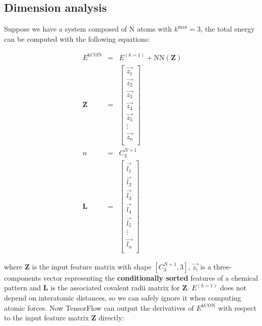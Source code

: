 \documentclass{article}
\begin{document}
\subsection{Dimension analysis}

Suppose we have a system composed of N atoms with $k^\mathrm{max}=3$, the total energy can be 
computed with the following equations:

\begin{eqnarray}
	E^{\mathrm{kCON}} & = & E^{(k=1)} + \mathrm{NN}(\boldsymbol{Z}) \\
	\boldsymbol{Z} & = & \left[
		\begin{array}{c}
			\vec{z_{1}}  \\
			\vec{z_{2}}  \\
			\vec{z_{3}}  \\
			\vec{z_{4}}  \\
			\vec{z_{5}}  \\
			\vdots \\
			\vec{z_{n}}  \\
		\end{array}
	\right]                                                         \\
	n & = & C^{N + 1}_3                                             \\
	\boldsymbol{L} & = & \left[
		\begin{array}{c}
			\vec{l_{1}}  \\
			\vec{l_{2}}  \\
			\vec{l_{3}}  \\
			\vec{l_{4}}  \\
			\vec{l_{5}}  \\
			\vdots \\
			\vec{l_{n}}  \\			
		\end{array}
	\right]
\end{eqnarray}

\noindent where \textbf{Z} is the input feature matrix with shape $[C^{N+1}_{3}, 3]$, 
$\vec{z_{i}}$ is a three-components vector representing the \textbf{conditionally sorted} 
features of a chemical pattern and \textbf{L} is the associated covalent radii matrix for 
\textbf{Z}. $E^{(k=1)}$ does not depend on interatomic distances, so we can safely ignore it 
when computing atomic forces. Now TensorFlow can output the derivatives of 
$E^{\mathrm{kCON}}$ with respect to the input feature matrix \textbf{Z} directly:
\end{document}
